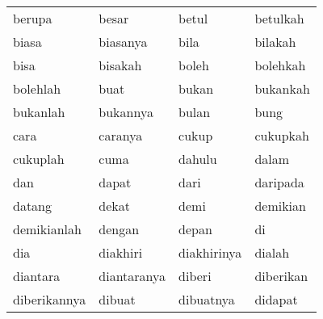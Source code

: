 \begin{tabular}{ | l | l | l | l | }
berupa & besar & betul & betulkah\\
biasa & biasanya & bila & bilakah\\
bisa & bisakah & boleh & bolehkah\\
bolehlah & buat & bukan & bukankah\\
bukanlah & bukannya & bulan & bung\\
cara & caranya & cukup & cukupkah\\
cukuplah & cuma & dahulu & dalam\\
dan & dapat & dari & daripada\\
datang & dekat & demi & demikian\\
demikianlah & dengan & depan & di\\
dia & diakhiri & diakhirinya & dialah\\
diantara & diantaranya & diberi & diberikan\\
diberikannya & dibuat & dibuatnya & didapat\\
\end{tabular}


